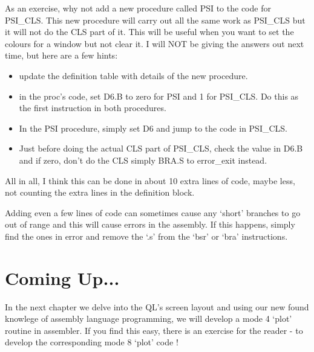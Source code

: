 As an exercise, why not add a new procedure called PSI to the code
    for PSI\_CLS. This new procedure will carry out all the same work as
    PSI\_CLS but it will not do the CLS part of it. This will be useful when
    you want to set the colours for a window but not clear it. I will NOT be
    giving the answers out next time, but here are a few hints:
\begin{itemize}[itemsep=0pt]

\item{}update the definition table with details of the new
        procedure.


\item{}in the proc's code, set D6.B to zero for PSI and 1 for PSI\_CLS.
        Do this as the first instruction in both procedures.


\item{}In the PSI procedure, simply set D6 and jump to the code in
        PSI\_CLS.


\item{}Just before doing the actual CLS part of PSI\_CLS, check the
        value in D6.B and if zero, don't do the CLS simply BRA.S to error\_exit
        instead.

\end{itemize}

All in all, I think this can be done in about 10 extra lines of
    code, maybe less, not counting the extra lines in the definition
    block.

\begin{warning}
Adding even a few lines of code can sometimes cause any `short'
      branches to go out of range and this will cause errors in the assembly.
      If this happens, simply find the ones in error and remove the `.s' from
      the `bsr' or `bra' instructions.
\end{warning}

\section{Coming Up...}
\label{ch7-the-end}%

In the next chapter we delve into the QL's screen layout and using
    our new found knowlege of assembly language programming, we will develop a
    mode 4 `plot' routine in assembler. If you find this easy, there is an
    exercise for the reader -{} to develop the corresponding mode 8 `plot' code
   !

